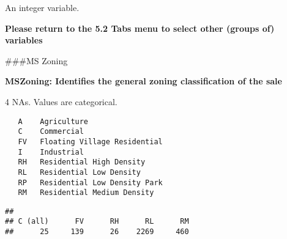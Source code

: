 \documentclass[]{article}
\newenvironment{Shaded}{\begin{snugshade}}{\end{snugshade}}
\newcommand{\CommentTok}[1]{\textcolor[rgb]{0.56,0.35,0.01}{\textit{#1}}}
\newcommand{\DecValTok}[1]{\textcolor[rgb]{0.00,0.00,0.81}{#1}}
\newcommand{\KeywordTok}[1]{\textcolor[rgb]{0.13,0.29,0.53}{\textbf{#1}}}
\newcommand{\NormalTok}[1]{#1}
\newcommand{\OperatorTok}[1]{\textcolor[rgb]{0.81,0.36,0.00}{\textbf{#1}}}
\newcommand{\StringTok}[1]{\textcolor[rgb]{0.31,0.60,0.02}{#1}}
\begin{document}
An integer variable.

\begin{Shaded}
\end{Shaded}

\textbf{Please return to the 5.2 Tabs menu to select other (groups of)
variables}

\#\#\#MS Zoning

\textbf{MSZoning: Identifies the general zoning classification of the
sale}

4 NAs. Values are categorical.

\begin{verbatim}
   A    Agriculture
   C    Commercial
   FV   Floating Village Residential
   I    Industrial
   RH   Residential High Density
   RL   Residential Low Density
   RP   Residential Low Density Park 
   RM   Residential Medium Density
\end{verbatim}

\begin{Shaded}
\end{Shaded}

\begin{verbatim}
## 
## C (all)      FV      RH      RL      RM 
##      25     139      26    2269     460
\end{verbatim}

\begin{Shaded}
\end{Shaded}
\end{document}
